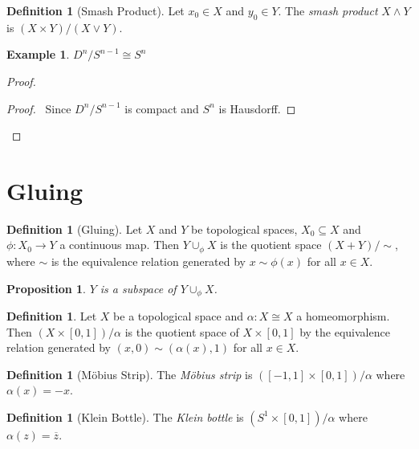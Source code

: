 \documentclass{book}
\let\qed\relax
\newtheorem{prop}[ax]{Proposition}
\theoremstyle{definition}
\newtheorem{df}[ax]{Definition}
\newtheorem{ex}[ax]{Example}
\begin{document}
\begin{df}[Smash Product]
Let $x_0 \in X$ and $y_0 \in Y$. The \emph{smash product} $X \wedge Y$ is $(X \times Y) / (X \vee Y)$.
\end{df}

\begin{ex}
$D^n / S^{n-1} \cong S^n$
\end{ex}

\begin{proof}
\pf
{}
\begin{proof}
	\pf\ Since $D^n / S^{n-1}$ is compact and $S^n$ is Hausdorff.
\end{proof}
\qed
\end{proof}

\section{Gluing}

\begin{df}[Gluing]
Let $X$ and $Y$ be topological spaces, $X_0 \subseteq X$ and $\phi : X_0 \rightarrow Y$ a continuous map. Then $Y \cup_\phi X$ is the quotient space $(X + Y)/ \sim$, where $\sim$ is the equivalence relation generated by $x \sim \phi(x)$ for all $x \in X$.
\end{df}

\begin{prop}
$Y$ is a subspace of $Y \cup_\phi X$.
\end{prop}

\begin{df}
Let $X$ be a topological space and $\alpha : X \cong X$ a homeomorphism. Then $(X \times [0,1]) / \alpha$ is the quotient space of $X \times [0,1]$ by the equivalence relation generated by $(x,0) \sim (\alpha(x),1)$ for all $x \in X$.
\end{df}

\begin{df}[M\"{o}bius Strip]
The \emph{M\"{o}bius strip} is $([-1,1] \times [0,1])/ \alpha$ where $\alpha(x) = -x$.
\end{df}

\begin{df}[Klein Bottle]
The \emph{Klein bottle} is $(S^1 \times [0,1]) / \alpha$ where $\alpha(z) = \overline{z}$.
\end{df}
\end{document}
